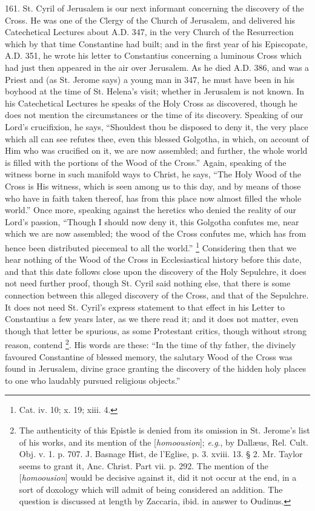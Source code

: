 161.
St. Cyril of Jerusalem is our next informant concerning the discovery
of the Cross. He was one of the Clergy of the Church of Jerusalem, and
delivered his Catechetical Lectures about A.D.
347, in the very Church of the Resurrection which by that time
Constantine had built; and in the first year of his Episcopate, A.D.
351, he wrote his letter to Constantius concerning a luminous Cross
which had just then appeared in the air over Jerusalem. As he died A.D.
386, and was a Priest and (as St. Jerome says) a young man in 347, he
must have been in his boyhood at the time of St. Helena's visit;
whether in Jerusalem is not known. In his Catechetical Lectures he
speaks of the Holy Cross as discovered, though he does not mention the
circumstances or the time of its discovery. Speaking of our Lord's
crucifixion, he says, ``Shouldest thou be disposed to deny it, the very
place which all can see refutes thee, even this blessed Golgotha, in
which, on account of Him who was crucified on it, we are now
assembled; and further, the whole world is filled with the portions of
the Wood of the Cross.'' Again, speaking of the witness borne in such
manifold ways to Christ, he says, ``The Holy Wood of the Cross is His
witness, which is seen among us to this day, and by means of those who
have in faith taken thereof, has from this place now almost
filled the whole world.'' Once more, speaking against the heretics who
denied the reality of our Lord's passion, ``Though I should now deny
it, this Golgotha confutes me, near which we are now assembled; the
wood of the Cross confutes me, which has from hence been distributed
piecemeal to all the world.'' \footnote{Cat. iv. 10; x. 19; xiii. 4.} Considering then that we hear nothing of the Wood of the Cross
in Ecclesiastical history before this date, and that this date follows
close upon the discovery of the Holy Sepulchre, it does not need
further proof, though St. Cyril said nothing else, that there is some
connection between this alleged discovery of the Cross, and that of
the Sepulchre. It does not need St. Cyril's express statement to that
effect in his Letter to Constantius a few years later, as we there
read it; and it does not matter, even though that letter be spurious,
as some Protestant critics, though without strong reason, contend \footnote{The authenticity of this Epistle is denied from its omission in St.
Jerome's list of his works, and its mention of the [\emph{homoousion}];
\emph{e.g}., by Dallæus, Rel. Cult. Obj. v. 1. p. 707. J. Basnage
Hist, de l'Eglise, p. 3. xviii. 13. § 2. Mr. Taylor seems to grant
it, Anc. Christ. Part vii. p. 292. The mention of the [\emph{homoousion}]
would be decisive against it, did it not occur at the end, in a sort
of doxology which will admit of being considered an addition. The
question is discussed at length by Zaccaria, ibid. in answer to
Oudinus.}. His words are these: ``In the time of thy father, the divinely
favoured Constantine of blessed memory, the salutary Wood of the
Cross was found in Jerusalem, divine grace granting the discovery of
the hidden holy places to one who laudably pursued religious objects.''

